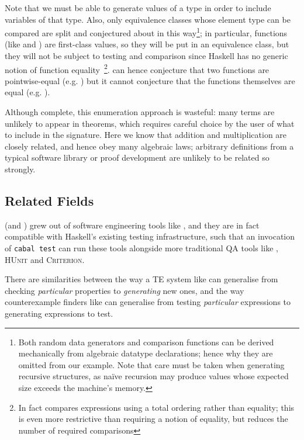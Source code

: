 Note that we must be able to generate values of a type in order to include
variables of that type. Also, only equivalence classes whose element type can be
compared are split and conjectured about in this way\footnote{Both random data
  generators and comparison functions can be derived mechanically from algebraic
  datatype declarations; hence why they are omitted from our example. Note that
  care must be taken when generating recursive structures, as na\"ive recursion
  may produce values whose expected size exceeds the machine's memory.}; in
particular, functions (like  and ) are first-class values, so
they will be put in an equivalence class, but they will not be subject to
testing and comparison since Haskell has no generic notion of function
equality~\footnote{In fact \quickspec{} compares expressions using a total
  ordering rather than equality; this is even more restrictive than requiring a
  notion of equality, but reduces the number of required comparisons}.
\quickspec{} can hence conjecture that two functions are pointwise-equal (e.g.
) but it cannot conjecture that the functions themselves are
equal (e.g. ).

Although complete, this enumeration approach is wasteful: many terms are
unlikely to appear in theorems, which requires careful choice by the user of
what to include in the signature. Here we know that addition and multiplication
are closely related, and hence obey many algebraic laws; arbitrary definitions
from a typical software library or proof development are unlikely to be related
so strongly.

\subsection{Related Fields}

\quickspec{} (and \hipspec{}) grew out of software engineering tools like
\quickcheck{}, and they are in fact compatible with Haskell's existing testing
infrastructure, such that an invocation of \texttt{cabal test} can run these
tools alongside more traditional QA tools like \quickcheck{}, \textsc{HUnit} and
\textsc{Criterion}.

There are similarities between the way a TE system like \quickspec{} can
generalise from checking \emph{particular} properties to \emph{generating} new
ones, and the way counterexample finders like \quickcheck{} can generalise from
testing \emph{particular} expressions to generating expressions to test.

